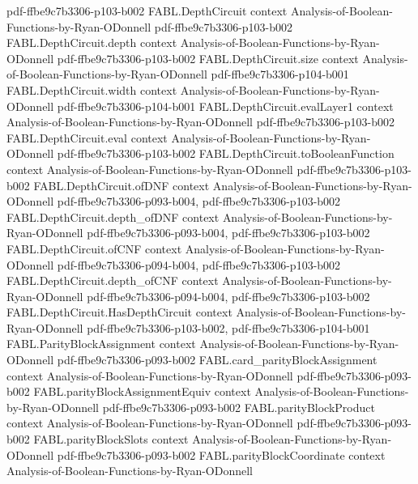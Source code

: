 \begin{theorem}
  {pdf-ffbe9c7b3306-p103-b002}
\proofstep
  {FABL.DepthCircuit}
  {context}
  {Analysis-of-Boolean-Functions-by-Ryan-ODonnell}
  {pdf-ffbe9c7b3306-p103-b002}
\proofstep
  {FABL.DepthCircuit.depth}
  {context}
  {Analysis-of-Boolean-Functions-by-Ryan-ODonnell}
  {pdf-ffbe9c7b3306-p103-b002}
\proofstep
  {FABL.DepthCircuit.size}
  {context}
  {Analysis-of-Boolean-Functions-by-Ryan-ODonnell}
  {pdf-ffbe9c7b3306-p104-b001}
\proofstep
  {FABL.DepthCircuit.width}
  {context}
  {Analysis-of-Boolean-Functions-by-Ryan-ODonnell}
  {pdf-ffbe9c7b3306-p104-b001}
\proofstep
  {FABL.DepthCircuit.evalLayer1}
  {context}
  {Analysis-of-Boolean-Functions-by-Ryan-ODonnell}
  {pdf-ffbe9c7b3306-p103-b002}
\proofstep
  {FABL.DepthCircuit.eval}
  {context}
  {Analysis-of-Boolean-Functions-by-Ryan-ODonnell}
  {pdf-ffbe9c7b3306-p103-b002}
\proofstep
  {FABL.DepthCircuit.toBooleanFunction}
  {context}
  {Analysis-of-Boolean-Functions-by-Ryan-ODonnell}
  {pdf-ffbe9c7b3306-p103-b002}
\proofstep
  {FABL.DepthCircuit.ofDNF}
  {context}
  {Analysis-of-Boolean-Functions-by-Ryan-ODonnell}
  {pdf-ffbe9c7b3306-p093-b004,
    pdf-ffbe9c7b3306-p103-b002}
\proofstep
  {FABL.DepthCircuit.depth_ofDNF}
  {context}
  {Analysis-of-Boolean-Functions-by-Ryan-ODonnell}
  {pdf-ffbe9c7b3306-p093-b004,
    pdf-ffbe9c7b3306-p103-b002}
\proofstep
  {FABL.DepthCircuit.ofCNF}
  {context}
  {Analysis-of-Boolean-Functions-by-Ryan-ODonnell}
  {pdf-ffbe9c7b3306-p094-b004,
    pdf-ffbe9c7b3306-p103-b002}
\proofstep
  {FABL.DepthCircuit.depth_ofCNF}
  {context}
  {Analysis-of-Boolean-Functions-by-Ryan-ODonnell}
  {pdf-ffbe9c7b3306-p094-b004,
    pdf-ffbe9c7b3306-p103-b002}
\proofstep
  {FABL.DepthCircuit.HasDepthCircuit}
  {context}
  {Analysis-of-Boolean-Functions-by-Ryan-ODonnell}
  {pdf-ffbe9c7b3306-p103-b002,
    pdf-ffbe9c7b3306-p104-b001}
\proofstep
  {FABL.ParityBlockAssignment}
  {context}
  {Analysis-of-Boolean-Functions-by-Ryan-ODonnell}
  {pdf-ffbe9c7b3306-p093-b002}
\proofstep
  {FABL.card_parityBlockAssignment}
  {context}
  {Analysis-of-Boolean-Functions-by-Ryan-ODonnell}
  {pdf-ffbe9c7b3306-p093-b002}
\proofstep
  {FABL.parityBlockAssignmentEquiv}
  {context}
  {Analysis-of-Boolean-Functions-by-Ryan-ODonnell}
  {pdf-ffbe9c7b3306-p093-b002}
\proofstep
  {FABL.parityBlockProduct}
  {context}
  {Analysis-of-Boolean-Functions-by-Ryan-ODonnell}
  {pdf-ffbe9c7b3306-p093-b002}
\proofstep
  {FABL.parityBlockSlots}
  {context}
  {Analysis-of-Boolean-Functions-by-Ryan-ODonnell}
  {pdf-ffbe9c7b3306-p093-b002}
\proofstep
  {FABL.parityBlockCoordinate}
  {context}
  {Analysis-of-Boolean-Functions-by-Ryan-ODonnell}

\end{theorem}
